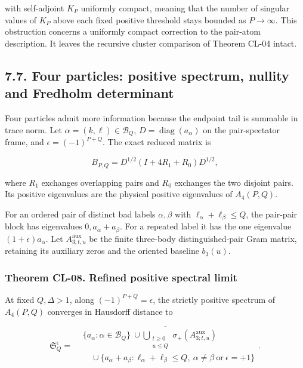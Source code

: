 \documentclass[a4paper,11pt]{article}
\numberwithin{equation}{section}
\begin{document}
with self-adjoint \(K_P\) uniformly compact, meaning that the number of singular values of \(K_P\) above each fixed positive threshold stays bounded as \(P\to\infty\). This obstruction concerns a uniformly compact correction to the pair-atom description. It leaves the recursive cluster comparison of Theorem CL-04 intact.

\hypertarget{four-particles-positive-spectrum-nullity-and-fredholm-determinant}{%
\subsection{7.7. Four particles: positive spectrum, nullity and Fredholm determinant}\label{four-particles-positive-spectrum-nullity-and-fredholm-determinant}}

Four particles admit more information because the endpoint tail is summable in trace norm. Let \(\alpha=(k,\ell)\in\mathcal B_Q\), \(D=\operatorname{diag}(a_\alpha)\) on the pair-spectator frame, and \(\epsilon=(-1)^{P+Q}\). The exact reduced matrix is

\[
B_{P,Q}=D^{1/2}(I+4R_1+R_0)D^{1/2},
\tag{CL.23}
\]

where \(R_1\) exchanges overlapping pairs and \(R_0\) exchanges the two disjoint pairs. Its positive eigenvalues are the physical positive eigenvalues of \(A_4(P,Q)\).

For an ordered pair of distinct bad labels \(\alpha,\beta\) with \(\ell_\alpha+\ell_\beta\leq Q\), the pair-pair block has eigenvalues \(0,a_\alpha+a_\beta\). For a repeated label it has the one eigenvalue \((1+\epsilon)a_\alpha\). Let \(A_{3;t,u}^{\mathrm{aux}}\) be the finite three-body distinguished-pair Gram matrix, retaining its auxiliary zeros and the oriented baseline \(b_3(u)\).

\hypertarget{theorem-cl-08.-refined-positive-spectral-limit}{%
\subsubsection{Theorem CL-08. Refined positive spectral limit}\label{theorem-cl-08.-refined-positive-spectral-limit}}

At fixed \(Q,\Delta>1\), along \((-1)^{P+Q}=\epsilon\), the strictly positive spectrum of \(A_4(P,Q)\) converges in Hausdorff distance to

\[
\mathfrak S_Q^\epsilon=
\overline{\begin{aligned}
&\{a_\alpha:\alpha\in\mathcal B_Q\}
\ \cup\!\bigcup_{\substack{t\geq0\\u\leq Q}}
\sigma_+(A_{3;t,u}^{\mathrm{aux}})\\
&\quad\cup\{a_\alpha+a_\beta:
\ell_\alpha+\ell_\beta\leq Q,
\ \alpha\ne\beta\ \text{or}\ \epsilon=+1\}
\end{aligned}}.
\tag{CL.24}
\]
\end{document}
